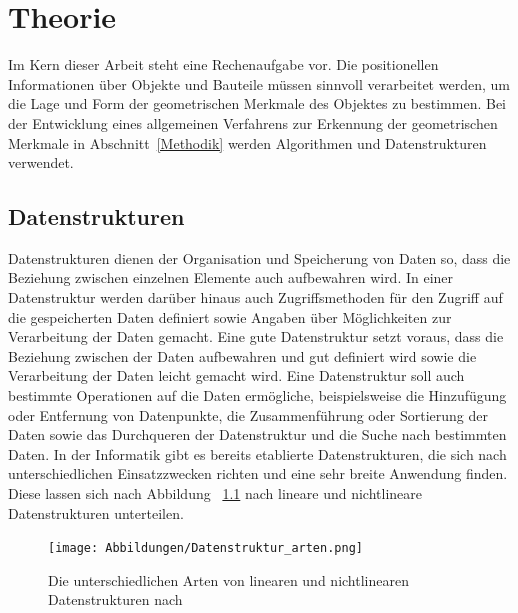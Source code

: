%	
%		
% 		

\chapter{Theorie}
Im Kern dieser Arbeit steht eine Rechenaufgabe vor. Die positionellen Informationen über Objekte und Bauteile müssen sinnvoll verarbeitet werden, um die Lage und Form der geometrischen Merkmale des Objektes zu bestimmen. Bei der Entwicklung eines allgemeinen Verfahrens zur Erkennung der geometrischen Merkmale in Abschnitt~\ref{Methodik} werden Algorithmen und Datenstrukturen verwendet. 

\section{Datenstrukturen} \label{Datenstrukturen}

Datenstrukturen dienen der Organisation und Speicherung von Daten so, dass die Beziehung zwischen einzelnen Elemente auch aufbewahren wird. In einer Datenstruktur werden darüber hinaus auch Zugriffsmethoden für den Zugriff auf die gespeicherten Daten definiert sowie Angaben über Möglichkeiten zur Verarbeitung der Daten gemacht. Eine gute Datenstruktur setzt voraus, dass die Beziehung zwischen der Daten aufbewahren und gut definiert wird sowie die Verarbeitung der Daten leicht gemacht wird. Eine Datenstruktur soll auch bestimmte Operationen auf die Daten ermögliche, beispielsweise die Hinzufügung oder Entfernung von Datenpunkte, die Zusammenführung oder Sortierung der Daten sowie das Durchqueren der Datenstruktur und die Suche nach bestimmten Daten. In der Informatik gibt es bereits etablierte Datenstrukturen, die sich nach unterschiedlichen Einsatzzwecken richten und eine sehr breite Anwendung finden. Diese lassen sich nach Abbildung ~\ref{fig: datastructures} nach lineare und nichtlineare Datenstrukturen unterteilen. \autocite[1-2]{mohanty_data_2021}

\begin{figure}[h]
	\texttt{[image: Abbildungen/Datenstruktur\_arten.png]}
	\centering
	\caption{Die unterschiedlichen Arten von linearen und nichtlinearen Datenstrukturen nach \textcite[2]{mohanty_data_2021}}
	\label{fig: datastructures}
\end{figure}

